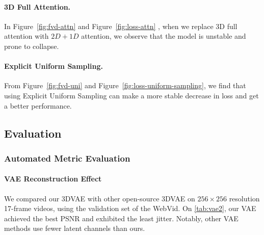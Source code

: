 \paragraph{3D Full Attention.}
In Figure~\ref{fig:fvd-attn} and Figure~\ref{fig:loss-attn} , when we replace 3D full attention with $2D + 1D$ attention, we observe that the model is unstable and prone to collapse.

\paragraph{Explicit Uniform Sampling.}
From Figure~\ref{fig:fvd-uni} and Figure~\ref{fig:loss-uniform-sampling}, we find that using Explicit Uniform Sampling can make a more stable decrease in loss and get a better performance.

\subsection{Evaluation}




\subsubsection{Automated Metric Evaluation} 


\paragraph{VAE Reconstruction Effect}
We compared our 3DVAE with other open-source 3DVAE on $256\times256$ resolution 17-frame videos, using the validation set of the WebVid\citep{Bain21}. On \cref{tab:vae2}, our VAE achieved the best PSNR and exhibited the least jitter. Notably, other VAE methods use fewer latent channels than ours.


